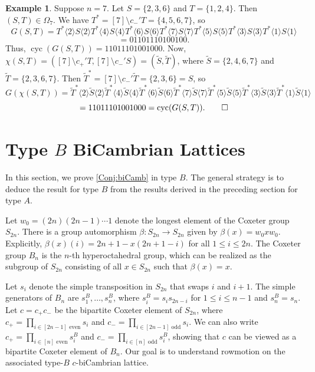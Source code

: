 \documentclass[11pt]{amsart}
\newcommand{\cyc}{\operatorname{cyc}}
\theoremstyle{definition}
\newtheorem{example}[theorem]{Example}
\begin{document}
\begin{example}
Suppose $n=7$. Let $S=\{2,3,6\}$ and $T=\{1,2,4\}$. Then $(S,T)\in\Omega_7$. We have $T^*=[7]\setminus c_-'T=\{4,5,6,7\}$, so \[G(S,T)=T^*\langle 2\rangle S\langle 2\rangle T^*\langle 4\rangle S\langle 4\rangle T^*\langle 6\rangle S\langle 6\rangle T^*\langle 7\rangle S\langle 7\rangle T^*\langle 5\rangle S\langle 5\rangle T^*\langle 3\rangle S\langle 3\rangle T^*\langle 1\rangle S\langle 1\rangle\] \[=01101110100100.\] Thus, $\cyc(G(S,T))=11011101001000$. Now, $\chi(S,T)=([7]\setminus c_+'T,[7]\setminus c_-'S)=(\widetilde S,\widetilde T)$, where $\widetilde S=\{2,4,6,7\}$ and $\widetilde T=\{2,3,6,7\}$. Then $\widetilde T^*=[7]\setminus c_-'\widetilde T=\{2,3,6\}=S$, so \[G(\chi(S,T))=\widetilde T^*\langle 2\rangle \widetilde S\langle 2\rangle \widetilde T^*\langle 4\rangle \widetilde S\langle 4\rangle \widetilde T^*\langle 6\rangle \widetilde S\langle 6\rangle \widetilde T^*\langle 7\rangle \widetilde S\langle 7\rangle \widetilde T^*\langle 5\rangle \widetilde S\langle 5\rangle \widetilde T^*\langle 3\rangle \widetilde S\langle 3\rangle \widetilde T^*\langle 1\rangle \widetilde S\langle 1\rangle\] \[=11011101001000=\cyc(G(S,T)).\qedhere\]
\end{example}


\section{Type $B$ BiCambrian Lattices}\label{Sec:BiCambrianB}
In this section, we prove \cref{Conj:biCamb} in type $B$. The general strategy is to deduce the result for type $B$ from the results derived in the preceding section for type $A$. 

Let $w_0=(2n)(2n-1)\cdots 1$ denote the longest element of the Coxeter group $S_{2n}$. There is a group automorphism $\beta\colon S_{2n}\to S_{2n}$ given by $\beta(x)=w_0xw_0$. Explicitly, $\beta(x)(i)=2n+1-x(2n+1-i)$ for all $1\leq i \leq 2n$. The Coxeter group $B_n$ is the $n$-th hyperoctahedral group, which can be realized as the subgroup of $S_{2n}$ consisting of all $x\in S_{2n}$ such that $\beta(x)=x$. 

Let $s_i$ denote the simple transposition in $S_{2n}$ that swaps $i$ and $i+1$. The simple generators of $B_n$ are $s_1^B,\ldots,s_n^B$, where $s_i^B=s_is_{2n-i}$ for $1\leq i\leq n-1$ and $s_n^B=s_n$. Let $c=c_+c_-$ be the bipartite Coxeter element of $S_{2n}$, where $c_+=\prod_{i\in[2n-1]\text{ even}}s_i$ and $c_-=\prod_{i\in[2n-1]\text{ odd}}s_i$. We can also write $c_+=\prod_{i\in[n]\text{ even}}s_i^B$ and $c_-=\prod_{i\in[n]\text{ odd}}s_i^B$, showing that $c$ can be viewed as a bipartite Coxeter element of $B_n$. Our goal is to understand rowmotion on the associated type-$B$ $c$-biCambrian lattice. 
\end{document}

